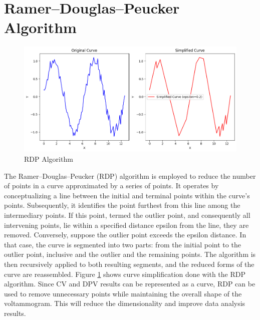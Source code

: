 \section{Ramer–Douglas–Peucker Algorithm}
\begin{figure}[h!]
  \centering
    \includegraphics[width=1.0\textwidth]{figures/rdp.png}
    \caption{RDP Algorithm}
    \label{rdp}
\end{figure}
The Ramer–Douglas–Peucker (RDP) algorithm is employed to reduce the number of points in a curve approximated by a series of points. It operates by conceptualizing a line between the initial and terminal points within the curve's points. Subsequently, it identifies the point furthest from this line among the intermediary points. If this point, termed the outlier point, and consequently all intervening points, lie within a specified distance epsilon from the line, they are removed. Conversely, suppose the outlier point exceeds the epsilon distance. In that case, the curve is segmented into two parts: from the initial point to the outlier point, inclusive and the outlier and the remaining points. The algorithm is then recursively applied to both resulting segments, and the reduced forms of the curve are reassembled. Figure \ref{rdp} shows curve simplification done with the RDP algorithm. Since CV and DPV results can be represented as a curve, RDP can be used to remove unnecessary points while maintaining the overall shape of the voltammogram. This will reduce the dimensionality and improve data analysis results.
